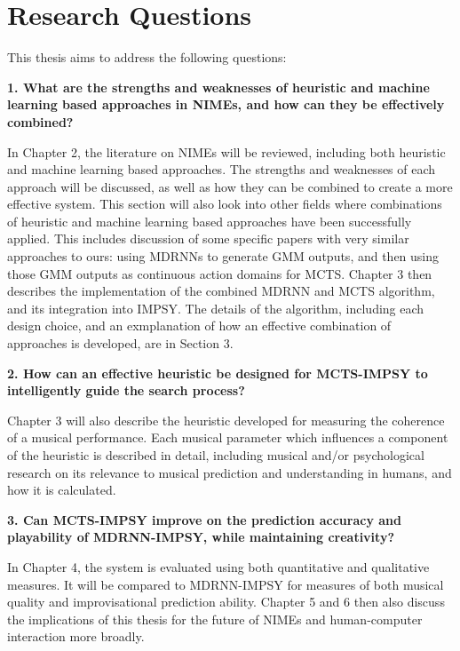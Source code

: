 \section{Research Questions}
This thesis aims to address the following questions:

\textbf{1. What are the strengths and weaknesses of heuristic and machine learning based approaches in NIMEs, and how can they be effectively combined?}

In Chapter 2, the literature on NIMEs will be reviewed, including both heuristic and machine learning based approaches. The strengths and weaknesses of each approach will be discussed, as well as how they can be combined to create a more effective system. This section will also look into other fields where combinations of heuristic and machine learning based approaches have been successfully applied. This includes discussion of some specific papers with very similar approaches to ours: using MDRNNs to generate GMM outputs, and then using those GMM outputs as continuous action domains for MCTS. Chapter 3 then describes the implementation of the combined MDRNN and MCTS algorithm, and its integration into IMPSY. The details of the algorithm, including each design choice, and an exmplanation of how an effective combination of approaches is developed, are in Section 3.

\textbf{2. How can an effective heuristic be designed for MCTS-IMPSY to intelligently guide the search process?}

Chapter 3 will also describe the heuristic developed for measuring the coherence of a musical performance. Each musical parameter which influences a component of the heuristic is described in detail, including musical and/or psychological research on its relevance to musical prediction and understanding in humans, and how it is calculated.


\textbf{3. Can MCTS-IMPSY improve on the prediction accuracy and playability of MDRNN-IMPSY, while maintaining creativity?}

In Chapter 4, the system is evaluated using both quantitative and qualitative measures. It will be compared to MDRNN-IMPSY for measures of both musical quality and improvisational prediction ability. Chapter 5 and 6 then also discuss the implications of this thesis for the future of NIMEs and human-computer interaction more broadly.

